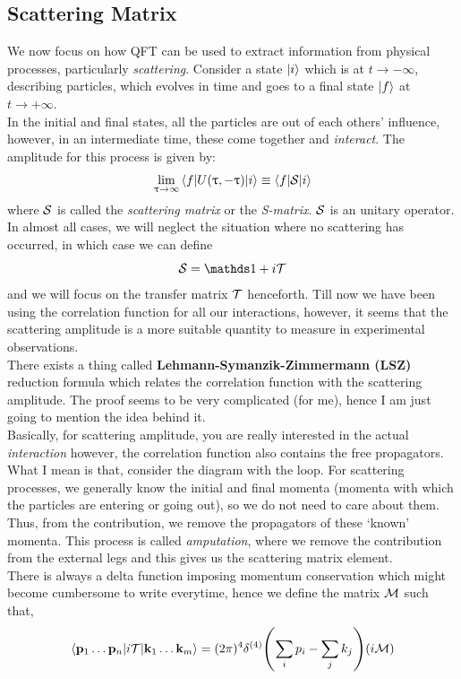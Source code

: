 \subsection{Scattering Matrix}
We now focus on how QFT can be used to extract information from physical processes, particularly \textit{scattering}. Consider a state $\ket{i}$ which is at $t\to -\infty$, describing particles, which evolves in time and goes to a final state $\ket{f}$ at $t\to +\infty$.\\[0.2cm] In the initial and final states, all the particles are out of each others' influence, however, in an intermediate time, these come together and \textit{interact}. The amplitude for this process is given by:
$$\lim\limits_{\uptau\to \infty}\braket{f|U(\uptau,-\uptau)|i} \equiv \braket{f|\mathcal S|i} $$ where $\mathcal S$ is called the \textit{scattering matrix} or the \textit{S-matrix}. $\mathcal S$ is an unitary operator. In almost all cases, we will neglect the situation where no scattering has occurred, in which case we can define 
$$\Ss = \iden + i \ST$$
and we will focus on the transfer matrix $\mathcal T$ henceforth. Till now we have been using the correlation function for all our interactions, however, it seems that the scattering amplitude is a more suitable quantity to measure in experimental observations.\\[0.2cm] There exists a thing called \textbf{Lehmann-Symanzik-Zimmermann (LSZ)} reduction formula which relates the correlation function with the scattering amplitude. The proof seems to be very complicated (for me), hence I am just going to mention the idea behind it.\\[0.2cm]
Basically, for scattering amplitude, you are really interested in the actual \textit{interaction} however, the correlation function also contains the free propagators.\\[0.2cm]
What I mean is that, consider the diagram with the loop. For scattering processes, we generally know the initial and final momenta (momenta with which the particles are entering or going out), so we do not need to care about them. Thus, from the contribution, we remove the propagators of these `known' momenta. This process is called \textit{amputation}, where we remove the contribution from the external legs and this gives us the scattering matrix element. \\[0.2cm]
There is always a delta function imposing momentum conservation which might become cumbersome to write everytime, hence we define the matrix $\mathcal M$ such that, 
$$\braket{\vb{p}_1\ldots\vb{p}_n |i\mathcal T|\vb{k}_1\ldots \vb{k}_m} = (2\pi)^4 \delta^{(4)}\qty(\sum\limits_i p_i - \sum\limits_j k_j) (i\mathcal M)$$
